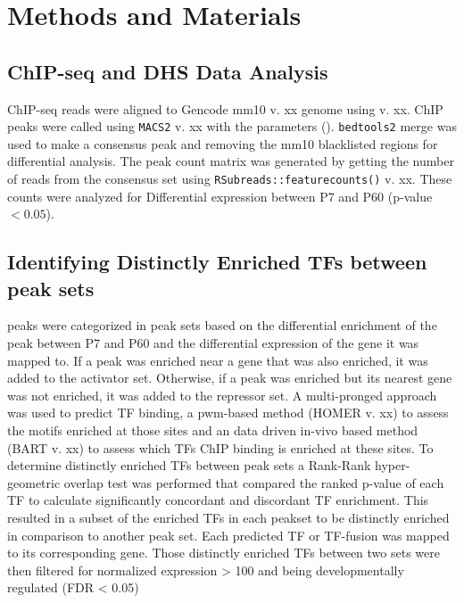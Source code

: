 \documentclass[fleqn,10pt]{wlscirep}
\begin{document}
\subsection*{}

\section*{Methods and Materials}
\subsection*{ChIP-seq and DHS Data Analysis}
ChIP-seq reads were aligned to Gencode mm10 v. xx genome using  v. xx. ChIP peaks were called using \texttt{MACS2} v. xx with the parameters ().  \texttt{bedtools2} merge was used to make a consensus peak and removing the mm10 blacklisted regions \cite{} for differential analysis. The peak count matrix was generated by getting the number of reads from the consensus set using \texttt{RSubreads::featurecounts()} v. xx. These counts were analyzed for Differential expression between P7 and P60  (p-value $< 0.05$). 


\subsection*{Identifying Distinctly Enriched  TFs between peak sets}
peaks were categorized in peak sets based on the differential enrichment of the peak between P7 and P60 and the differential expression of the gene it was mapped to. If a peak was enriched near a gene that was also enriched, it was added to the activator set. Otherwise, if a peak was enriched but its nearest gene was not enriched, it was added to the repressor set. A multi-pronged approach was used to predict TF binding, a pwm-based method (HOMER v. xx) \cite{} to assess the motifs enriched at those sites and an data driven in-vivo based method (BART v. xx) \cite{Zhenjiawang2018BART:Profiles, Ma2021BARTweb:Analysis} to assess which TFs ChIP binding is enriched at these sites. To determine distinctly enriched TFs between peak sets a Rank-Rank hyper-geometric overlap test \cite{RRHO} was performed that compared the ranked p-value of each TF  to calculate significantly concordant and discordant TF enrichment. This resulted in a subset of the enriched TFs in each peakset to be distinctly enriched in comparison to another peak set.  Each predicted TF or TF-fusion was mapped to its corresponding gene. Those distinctly enriched TFs between two sets were then filtered for normalized expression > 100 and being developmentally regulated (FDR < 0.05)
\end{document}
